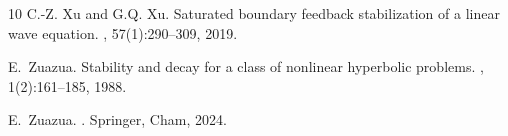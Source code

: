 \documentclass[11pt, a4paper]{amsart}
\theoremstyle{definition}
\numberwithin{equation}{section}
\begin{document}
\begin{thebibliography}{10}
C.-Z. Xu and G.Q. Xu.
\newblock Saturated boundary feedback stabilization of a linear wave equation.
, 57(1):290--309, 2019.

E.~Zuazua.
\newblock Stability and decay for a class of nonlinear hyperbolic problems.
, 1(2):161--185, 1988.

E.~Zuazua.
.
\newblock Springer, Cham, 2024.

\end{thebibliography}


 
\end{document}
